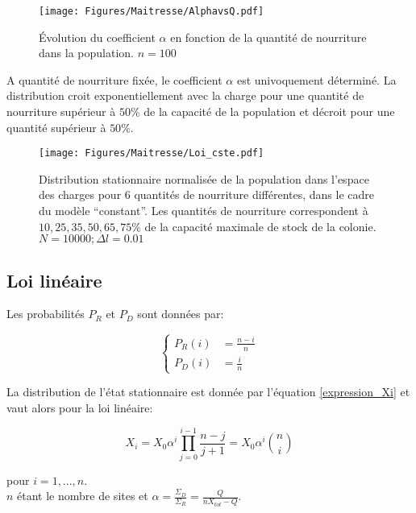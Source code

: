 \begin{figure}[h]
\centering
\texttt{[image: Figures/Maitresse/AlphavsQ.pdf]}
\caption{Évolution du coefficient $\alpha$ en fonction de la quantité de nourriture dans la population. $n=100$}
\label{AlphavsQCste}
\end{figure}

A quantité de nourriture fixée, le coefficient $\alpha$ est univoquement déterminé. La distribution croit exponentiellement avec la charge pour une quantité de nourriture supérieur à $50\%$ de la capacité de la population et décroit pour une quantité supérieur à $50\%$.



\begin{figure}[h]
\centering
\texttt{[image: Figures/Maitresse/Loi\_cste.pdf]}
\caption{Distribution stationnaire normalisée de la population dans l'espace des charges pour 6 quantités de nourriture différentes, dans le cadre du modèle ``constant''. Les quantités de nourriture correspondent à $10, 25, 35, 50, 65, 75\%$ de la capacité maximale de stock de la colonie. $N=10000; \Delta l = 0.01$}
\label{DistribAnalytiqueCste}
\end{figure}


\subsection{Loi linéaire}
Les probabilités $P_R$ et $P_D$ sont données par:

\begin{equation}
\left \{
\begin{aligned}
P_R(i) &= \frac{n-i}{n}\\
P_D(i) &= \frac{i}{n}
\end{aligned}
\right.
\end{equation}

La distribution de l'état stationnaire est donnée par l'équation \ref{expression_Xi} et vaut alors pour la loi linéaire:

\begin{equation}
X_i=X_0 \alpha^i \prod_{j=0}^{i-1} \frac{n-j}{j+1} =X_0 \alpha^i \binom{n}{i}
\end{equation}

pour $i=1,...,n$. \\

$n$ étant le nombre de sites et $\alpha = \frac{\Sigma_D}{\Sigma_R} = \frac{Q}{nX_{tot}-Q}$.\\


